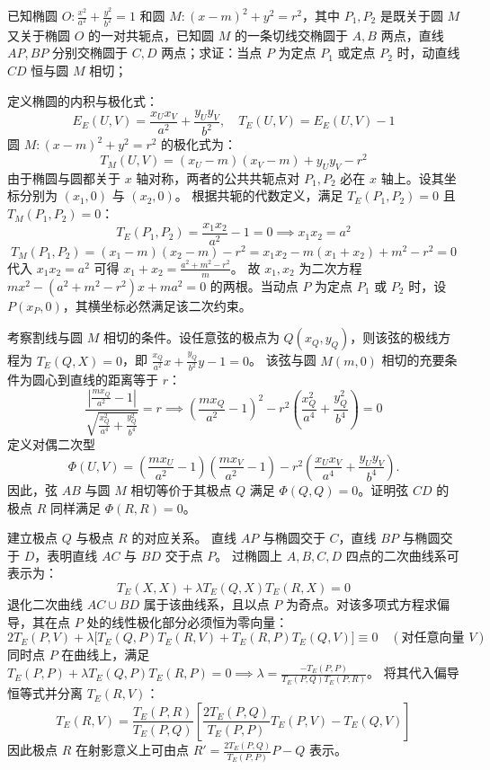 \begin{exercise}
已知椭圆 \(O: \frac{x^2}{a^2} + \frac{y^2}{b^2} = 1\) 和圆 \(M: (x - m)^2 + y^2 = r^2\)，其中 \(P_1, P_2\) 是既关于圆 \(M\) 又关于椭圆 \(O\) 的一对共轭点，已知圆 \(M\) 的一条切线交椭圆于 \(A, B\) 两点，直线 \(AP, BP\) 分别交椭圆于 \(C, D\) 两点；求证：当点 \(P\) 为定点 \(P_1\) 或定点 \(P_2\) 时，动直线 \(CD\) 恒与圆 \(M\) 相切；
\end{exercise}
\begin{solution}
定义椭圆的内积与极化式：
$$ E_E(U,V) = \frac{x_U x_V}{a^2} + \frac{y_U y_V}{b^2}, \quad T_E(U,V) = E_E(U,V) - 1 $$
圆 $M: (x-m)^2 + y^2 = r^2$ 的极化式为：
$$ T_M(U,V) = (x_U - m)(x_V - m) + y_U y_V - r^2 $$
由于椭圆与圆都关于 $x$ 轴对称，两者的公共共轭点对 $P_1, P_2$ 必在 $x$ 轴上。设其坐标分别为 $(x_1, 0)$ 与 $(x_2, 0)$。
根据共轭的代数定义，满足 $T_E(P_1, P_2) = 0$ 且 $T_M(P_1, P_2) = 0$：
$$ T_E(P_1, P_2) = \frac{x_1 x_2}{a^2} - 1 = 0 \implies x_1 x_2 = a^2 $$
$$ T_M(P_1, P_2) = (x_1 - m)(x_2 - m) - r^2 = x_1 x_2 - m(x_1 + x_2) + m^2 - r^2 = 0 $$
代入 $x_1 x_2 = a^2$ 可得 $x_1 + x_2 = \frac{a^2 + m^2 - r^2}{m}$。
故 $x_1, x_2$ 为二次方程 $m x^2 - (a^2 + m^2 - r^2)x + m a^2 = 0$ 的两根。当动点 $P$ 为定点 $P_1$ 或 $P_2$ 时，设 $P(x_P, 0)$，其横坐标必然满足该二次约束。

考察割线与圆 $M$ 相切的条件。设任意弦的极点为 $Q(x_Q, y_Q)$，则该弦的极线方程为 $T_E(Q, X) = 0$，即 $\frac{x_Q}{a^2}x + \frac{y_Q}{b^2}y - 1 = 0$。
该弦与圆 $M(m, 0)$ 相切的充要条件为圆心到直线的距离等于 $r$：
$$ \frac{\left| \frac{m x_Q}{a^2} - 1 \right|}{\sqrt{ \frac{x_Q^2}{a^4} + \frac{y_Q^2}{b^4} }} = r \implies \left( \frac{m x_Q}{a^2} - 1 \right)^2 - r^2 \left( \frac{x_Q^2}{a^4} + \frac{y_Q^2}{b^4} \right) = 0 $$
定义对偶二次型
\[
\Phi(U,V) = \left( \frac{m x_U}{a^2} - 1 \right)\left( \frac{m x_V}{a^2} - 1 \right) - r^2 \left( \frac{x_U x_V}{a^4} + \frac{y_U y_V}{b^4} \right).
\]
因此，弦 $AB$ 与圆 $M$ 相切等价于其极点 $Q$ 满足 $\Phi(Q, Q) = 0$。证明弦 $CD$ 的极点 $R$ 同样满足 $\Phi(R, R) = 0$。

建立极点 $Q$ 与极点 $R$ 的对应关系。
直线 $AP$ 与椭圆交于 $C$，直线 $BP$ 与椭圆交于 $D$，表明直线 $AC$ 与 $BD$ 交于点 $P$。
过椭圆上 $A, B, C, D$ 四点的二次曲线系可表示为：
$$ T_E(X, X) + \lambda T_E(Q, X) T_E(R, X) = 0 $$
退化二次曲线 $AC \cup BD$ 属于该曲线系，且以点 $P$ 为奇点。对该多项式方程求偏导，其在点 $P$ 处的线性极化部分必须恒为零向量：
$$ 2 T_E(P, V) + \lambda \big[ T_E(Q, P) T_E(R, V) + T_E(R, P) T_E(Q, V) \big] \equiv 0 \quad (\text{对任意向量 } V) $$
同时点 $P$ 在曲线上，满足 $T_E(P, P) + \lambda T_E(Q, P) T_E(R, P) = 0 \implies \lambda = \frac{-T_E(P, P)}{T_E(P, Q) T_E(P, R)}$。
将其代入偏导恒等式并分离 $T_E(R, V)$：
$$ T_E(R, V) = \frac{T_E(P, R)}{T_E(P, Q)} \left[ \frac{2 T_E(P, Q)}{T_E(P, P)} T_E(P, V) - T_E(Q, V) \right] $$
因此极点 $R$ 在射影意义上可由点 $R' = \frac{2 T_E(P, Q)}{T_E(P, P)} P - Q$ 表示。


\end{solution}
